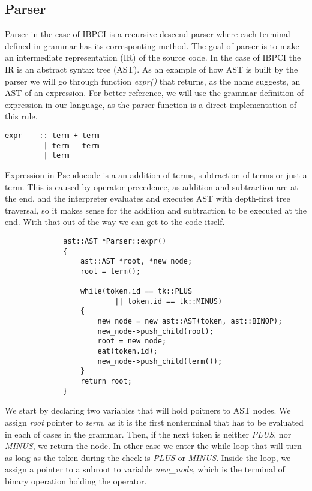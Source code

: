 \documentclass[12pt]{article}
\begin{document}
\subsection*{Parser}
Parser in the case of IBPCI is a recursive-descend parser where each terminal defined in 
grammar has its corresponting method. The goal of parser is to make an intermediate representation
(IR) of the source code. In the case of IBPCI the IR is an abstract syntax tree (AST). As an example
of how AST is built by the parser we will go through function \emph{expr()}
that returns, as the name suggests, an AST of an expression.
For better reference, we will use the grammar definition of expression in our language, 
as the parser function is a direct implementation of this rule.
\begin{verbatim}
expr    :: term + term
         | term - term
         | term
\end{verbatim}
Expression in Pseudocode is a an addition of terms, subtraction of terms or just a term.
This is caused by operator precedence, as addition and subtraction are at the end, and the 
interpreter evaluates and executes AST with depth-first tree traversal, so it makes sense for 
the addition and subtraction to be executed at the end. With that out of the way we can get to 
the code itself.
\begin{figure}[H]
    \caption{}
    \label{snip_1}
    \begin{verbatim}
        ast::AST *Parser::expr()
        {
            ast::AST *root, *new_node;
            root = term();

            while(token.id == tk::PLUS 
                    || token.id == tk::MINUS)
            {
                new_node = new ast::AST(token, ast::BINOP);
                new_node->push_child(root);
                root = new_node;
                eat(token.id);
                new_node->push_child(term());
            }
            return root;
        }
    \end{verbatim}
\end{figure}
We start by declaring two variables that will hold poitners to AST nodes. We assign \emph{root}
pointer to \emph{term}, as it is the first nonterminal that has to be 
evaluated in each of cases in the grammar. Then, if the next token is neither \emph{PLUS}, nor
\emph{MINUS}, we return the node. In other case we enter the while loop that will turn as long as
the token during the check is \emph{PLUS} or \emph{MINUS}. Inside the loop, we assign a pointer to 
a subroot to variable \emph{new\_node}, which is the terminal of binary operation holding the operator.
\end{document}
